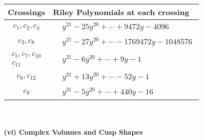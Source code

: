 \documentclass[1p]{elsarticle_modified}
\theoremstyle{definition}
\begin{document}
\begin{tabular}{m{50pt}|m{274pt}}
Crossings & \hspace{64pt}Riley Polynomials at each crossing \\
\hline $$\begin{aligned}c_{1},c_{2},c_{4}\end{aligned}$$&$\begin{aligned}
&y^{21}-25 y^{20}+\cdots+9472 y-4096
\end{aligned}$\\
\hline $$\begin{aligned}c_{3},c_{8}\end{aligned}$$&$\begin{aligned}
&y^{21}-27 y^{20}+\cdots-1769472 y-1048576
\end{aligned}$\\
\hline $$\begin{aligned}c_{5},c_{7},c_{10}\\c_{11}\end{aligned}$$&$\begin{aligned}
&y^{21}-6 y^{20}+\cdots+9 y-1
\end{aligned}$\\
\hline $$\begin{aligned}c_{6},c_{12}\end{aligned}$$&$\begin{aligned}
&y^{21}+13 y^{20}+\cdots-52 y-1
\end{aligned}$\\
\hline $$\begin{aligned}c_{9}\end{aligned}$$&$\begin{aligned}
&y^{21}-5 y^{20}+\cdots+440 y-16
\end{aligned}$\\
\hline
\end{tabular}\\~\\
\newpage\flushleft \textbf{(vi) Complex Volumes and Cusp Shapes}
\end{document}
